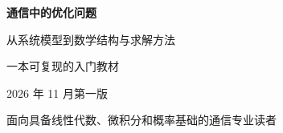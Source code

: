 \documentclass[UTF8,zihao=-4,openany,oneside,fontset=none]{ctexbook}
\begin{document}
\frontmatter
\hypersetup{pageanchor=false}
\begin{titlepage}
\centering
\vspace*{2.1cm}
{\Huge\bfseries 通信中的优化问题\par}
\vspace{0.7cm}
{\Large 从系统模型到数学结构与求解方法\par}
\vspace{1.5cm}
{\large 一本可复现的入门教材\par}
\vfill
{\large 2026 年 11 月\quad 第一版\par}
\vspace{0.8cm}
{\normalsize 面向具备线性代数、微积分和概率基础的通信专业读者\par}
\end{titlepage}
\hypersetup{pageanchor=true}

\tableofcontents
\mainmatter










\appendix


\backmatter

\end{document}
